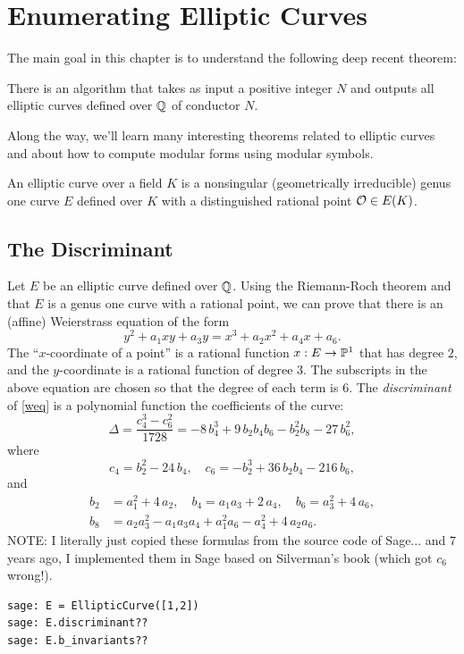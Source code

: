 \documentclass{book}
\begin{document}
\chapter{Enumerating Elliptic Curves}

The main goal in this chapter is to understand the
following deep recent theorem:
\begin{theorem}
There is an algorithm that
takes as input a positive integer $N$ and outputs all elliptic curves
defined over $\Q$ of conductor $N$.
\end{theorem}
Along the way, we'll learn many interesting theorems related
to elliptic curves and about how to compute modular forms using
modular symbols.

\begin{definition}
An elliptic curve over a field $K$
is a nonsingular (geometrically irreducible)
genus one curve $E$ defined over $K$
with a distinguished rational point $\O\in E(K)$.
\end{definition}


\section{The Discriminant}
Let $E$ be an elliptic curve defined over $\Q$.
Using the Riemann-Roch theorem and that $E$ is a genus one
curve with a rational point, we can prove that there
is an (affine) Weierstrass equation of the form
\begin{equation}\label{weq}
y^2 + a_1 xy + a_3 y = x^3 + a_2 x^2 + a_4 x + a_6.
\end{equation}
The ``$x$-coordinate of a  point'' is a
rational function $x:E\to\P^1$ that has degree $2$,
and the $y$-coordinate is a rational function of degree
$3$. The subscripts in the above equation are chosen
so that the degree of each term is $6$.
The {\em discriminant} of \eqref{weq} is a polynomial function the
coefficients of the curve:
\begin{equation}\label{eqn:delta}
\Delta = \frac{c_4^3 - c_6^2}{1728} =  -8 \, b_{4}^{3} + 9 \, b_{2} b_{4} b_{6} - b_{2}^{2} b_{8} - 27 \, b_{6}^{2},
\end{equation}
where
$$
c_4 = b_{2}^{2} - 24 \, b_{4},\quad{}
c_6 = -b_{2}^{3} + 36 \, b_{2} b_{4} - 216 \, b_{6},
$$
and
\begin{align*}
b_2 &= a_{1}^{2} + 4 \, a_{2}, \quad{}b_4 = a_{1} a_{3} + 2 \, a_{4},\quad{}b_6 =
a_{3}^{2} + 4 \, a_{6},\\
b_8 &= a_{2} a_{3}^{2} - a_{1} a_{3} a_{4} + a_{1}^{2} a_{6} - a_{4}^{2} + 4 \, a_{2} a_{6}.
\end{align*}
NOTE: I literally just copied these formulas from the source code
of Sage... and 7 years ago, I implemented them in Sage based
on Silverman's book (which got $c_6$ wrong!).
\begin{lstlisting}
sage: E = EllipticCurve([1,2])
sage: E.discriminant??
sage: E.b_invariants??
\end{lstlisting}
\end{document}
